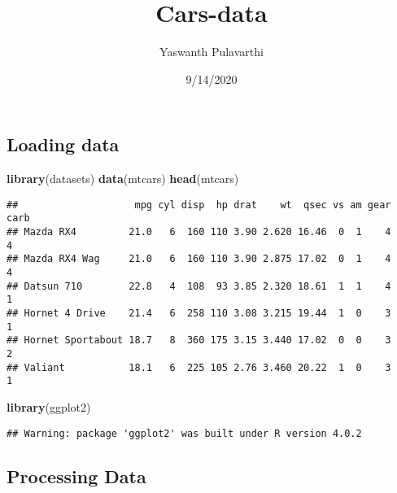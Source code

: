 \documentclass[
]{article}
\title{Cars-data}
\author{Yaswanth Pulavarthi}
\date{9/14/2020}
\newenvironment{Shaded}{\begin{snugshade}}{\end{snugshade}}
\newcommand{\KeywordTok}[1]{\textcolor[rgb]{0.13,0.29,0.53}{\textbf{#1}}}
\newcommand{\NormalTok}[1]{#1}
\newcommand{\OperatorTok}[1]{\textcolor[rgb]{0.81,0.36,0.00}{\textbf{#1}}}
\newcommand{\StringTok}[1]{\textcolor[rgb]{0.31,0.60,0.02}{#1}}
\begin{document}
\maketitle

\hypertarget{loading-data}{%
\subsection{Loading data}\label{loading-data}}

\begin{Shaded}
\begin{Highlighting}[]
\KeywordTok{library}\NormalTok{(datasets)}
\KeywordTok{data}\NormalTok{(mtcars)}
\KeywordTok{head}\NormalTok{(mtcars)}
\end{Highlighting}
\end{Shaded}

\begin{verbatim}
##                    mpg cyl disp  hp drat    wt  qsec vs am gear carb
## Mazda RX4         21.0   6  160 110 3.90 2.620 16.46  0  1    4    4
## Mazda RX4 Wag     21.0   6  160 110 3.90 2.875 17.02  0  1    4    4
## Datsun 710        22.8   4  108  93 3.85 2.320 18.61  1  1    4    1
## Hornet 4 Drive    21.4   6  258 110 3.08 3.215 19.44  1  0    3    1
## Hornet Sportabout 18.7   8  360 175 3.15 3.440 17.02  0  0    3    2
## Valiant           18.1   6  225 105 2.76 3.460 20.22  1  0    3    1
\end{verbatim}

\begin{Shaded}
\begin{Highlighting}[]
\KeywordTok{library}\NormalTok{(ggplot2)}
\end{Highlighting}
\end{Shaded}

\begin{verbatim}
## Warning: package 'ggplot2' was built under R version 4.0.2
\end{verbatim}

\hypertarget{processing-data}{%
\subsection{Processing Data}\label{processing-data}}

\begin{Shaded}
\end{Shaded}
\end{document}
